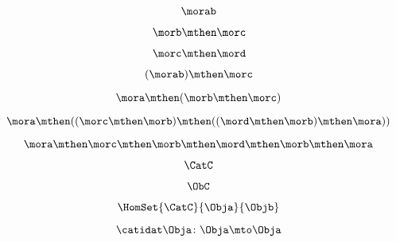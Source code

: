 {\begin{forslides}
        \begin{equation}
            \label{eq:semicats-slides-08}
            \morab
        \end{equation}

        \begin{equation}
            \label{eq:semicats-slides-09}
            \morb \mthen \morc
        \end{equation}

        \begin{equation}
            \label{eq:10}
            \morc \mthen \mord
        \end{equation}

        \begin{equation}
            \label{eq:semicats-slides-11}
            (\morab) \mthen \morc
        \end{equation}

        \begin{equation}
            \label{eq:semicats-slides-12}
            \mora \mthen  (\morb \mthen \morc )
        \end{equation}

        \begin{equation}
            \label{eq:semicats-slides-13}
            \mora \mthen  ((\morc \mthen \morb ) \mthen (( \mord \mthen \morb ) \mthen \mora ))
        \end{equation}

        \begin{equation}
            \label{eq:semicats-slides-14}
            \mora \mthen  \morc \mthen \morb  \mthen \mord \mthen \morb  \mthen \mora
        \end{equation}

        \begin{equation}
            \label{eq:semicats-slides-15}
            \CatC
        \end{equation}

        \begin{equation}
            \label{eq:semicats-slides-16}
            \ObC
        \end{equation}

        \begin{equation}
            \label{eq:semicats-slides-17}
            \HomSet{\CatC}{\Obja}{\Objb}
        \end{equation}

        \begin{equation}
            \label{eq:semicats-slides-18}
            \catidat\Obja\colon \Obja \mto \Obja
        \end{equation}


\end{forslides}}
